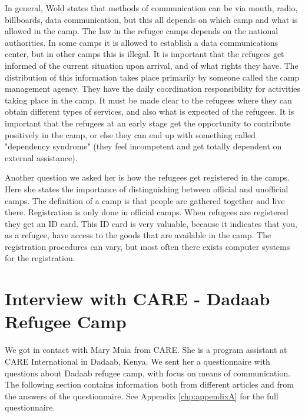 In general, Wold states that methods of communication can be via mouth, radio, billboards, data communication, but this all depends on which camp and what is allowed in the camp. The law in the refugee camps depends on the national authorities. In some camps it is allowed to establish a data communications center, but in other camps this is illegal. It is important that the refugees get informed of the current situation upon arrival, and of what rights they have. The distribution of this information takes place primarily by someone called the camp management agency. They have the daily coordination responsibility for activities taking place in the camp. It must be made clear to the refugees where they can obtain different types of services, and also what is expected of the refugees. It is important that the refugees at an early stage get the opportunity to contribute positively in the camp, or else they can end up with something called "dependency syndrome" (they feel incompetent and get totally dependent on external assistance). 

Another question we asked her is how the refugees get registered in the camps. Here she states the importance of distinguishing between official and unofficial camps. The definition of a camp is that people are gathered together and live there. Registration is only done in official camps. When refugees are registered they get an ID card. This ID card is very valuable, because it indicates that you, as a refugee, have access to the goods that are available in the camp. The registration procedures can vary, but most often there exists computer systems for the registration.



\section{Interview with CARE - Dadaab Refugee Camp}
\label{sec:interviewcare}
We got in contact with Mary Muia from CARE. She is a program assistant at CARE International in Dadaab, Kenya. We sent her a questionnaire with questions about Dadaab refugee camp, with focus on means of communication. The following section contains information both from different articles and from the answers of the questionnaire. See Appendix \ref{chp:appendixA} for the full questionnaire. 

